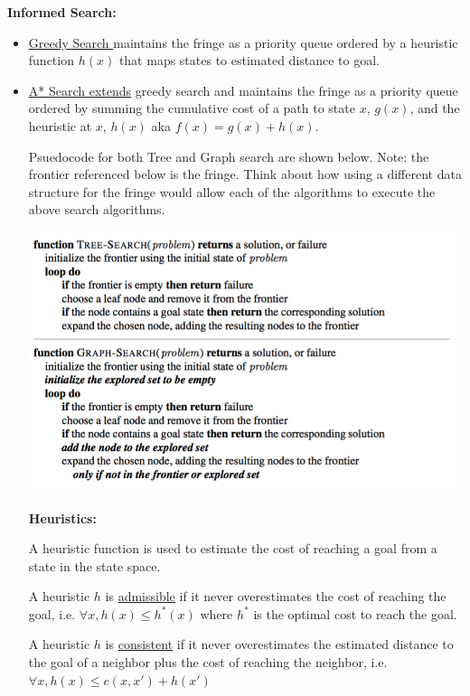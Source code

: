 \documentclass[11pt]{article}
\begin{document}
\textbf{Informed Search:}
\vspace{-10pt}
\begin{itemize}
\item \underline{Greedy Search }maintains the fringe as a priority queue ordered by a heuristic function $h(x)$ that maps states to estimated distance to goal.

\item \underline{A* Search extends} greedy search and maintains the fringe as a priority queue ordered by summing the cumulative cost of a path to state $x$, $g(x)$, and the heuristic at $x$, $h(x)$ aka
$f(x) = g(x) + h(x)$.

\newpage
Psuedocode for both Tree and Graph search are shown below. Note: the frontier referenced below is the fringe. Think about how using a different data structure for the fringe would allow each of the algorithms to execute the above search algorithms.

\includegraphics{img/search}

\textbf{Heuristics:}

A heuristic function is used to estimate the cost of reaching a goal
from a state in the state space.

A heuristic $h$ is \underline{admissible} if it never overestimates the cost
of reaching the goal, i.e. $\forall x, h(x) \le h^*(x)$ where
$h^*$ is the optimal cost to reach the goal.

A heuristic $h$ is \underline{consistent} if it never overestimates
the estimated distance to the goal of a neighbor plus
the cost of reaching the neighbor, i.e.
$\forall x, h(x) \le c(x, x') + h(x')$

\end{itemize}

\newpage
\end{document}
